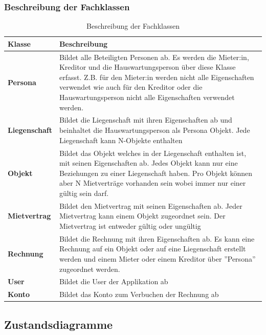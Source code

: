 \subsubsection{Beschreibung der Fachklassen}
\begin{table}[H]
  \centering
  \settowidth{}
  \setlength\extrarowheight{2pt}
    \begin{tabulary}{1.0\textwidth}{|L|m{15cm}|}
      \hline
      \textbf{Klasse}& \textbf{Beschreibung}\\
    \hline
    \textbf{Persona} & Bildet alle Beteiligten Personen ab. Es werden die Mieter:in, Kreditor und die Hauswartungsperson über diese Klasse erfasst. Z.B. für den Mieter:in werden nicht alle Eigenschaften verwendet wie auch für den Kreditor oder die Hauswartungsperson nicht alle Eigenschaften verwendet werden.\\
    \hline
    \textbf{Liegenschaft} & Bildet die Liegenschaft mit ihren Eigenschaften ab und beinhaltet die Hauswartungsperson als Persona Objekt. Jede Liegenschaft kann N-Objekte enthalten\\
    \hline
    \textbf{Objekt} & Bildet das Objekt welches in der Liegenschaft enthalten ist, mit seinen Eigenschaften ab. Jedes Objekt kann nur eine Beziehungen zu einer Liegenschaft haben. Pro Objekt können aber N Mietverträge vorhanden sein wobei immer nur einer gültig sein darf. \\
    \hline
    \textbf{Mietvertrag} & Bildet den Mietvertrag mit seinen Eigenschaften ab. Jeder Mietvertrag kann einem Objekt zugeordnet sein. Der Mietvertrag ist entweder gültig oder ungültig\\
    \hline
    \textbf{Rechnung} & Bildet die Rechnung mit ihren Eigenschaften ab. Es kann eine Rechnung auf ein Objekt oder auf eine Liegenschaft erstellt werden und einem Mieter oder einem Kreditor über ''Persona'' zugeordnet werden.\\
    \hline
    \textbf{User} & Bildet die User der Applikation ab\\
    \hline
    \textbf{Konto} & Bildet das Konto zum Verbuchen der Rechnung ab\\
    \hline 
\end{tabulary}
\caption{Beschreibung der Fachklassen}
\end{table}

\subsection{Zustandsdiagramme}

